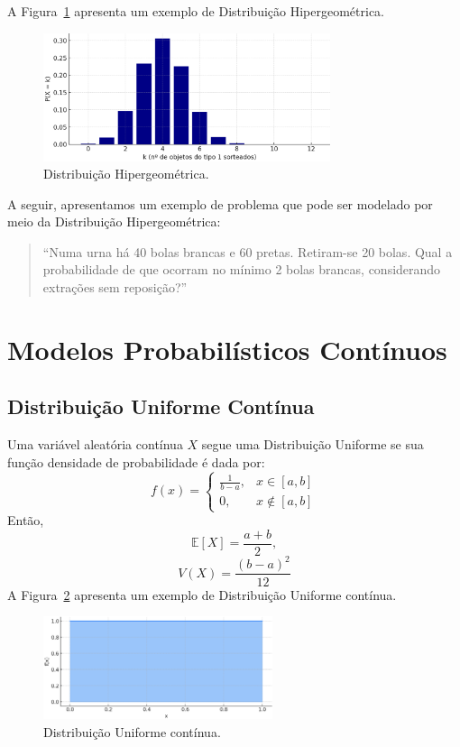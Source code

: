 \documentclass{article}
\begin{document}
A Figura~\ref{fig:dist_disc_hipergeometrica} apresenta um exemplo de Distribuição Hipergeométrica.

\begin{figure}[H]
    \centering
    \includegraphics[width=0.75\textwidth]{figuras/dist_disc_hipergeometrica.png}
    \caption{Distribuição Hipergeométrica.}
    \label{fig:dist_disc_hipergeometrica}
\end{figure}

A seguir, apresentamos um exemplo de problema que pode ser modelado por meio da Distribuição Hipergeométrica:
\begin{quote}
``Numa urna há 40 bolas brancas e 60 pretas. Retiram-se 20 bolas. Qual a probabilidade de que ocorram no mínimo 2 bolas brancas, considerando extrações sem reposição?''
\end{quote}

\section{Modelos Probabilísticos Contínuos}

\subsection{Distribuição Uniforme Contínua}
Uma variável aleatória contínua $X$ segue uma Distribuição Uniforme se sua função densidade de probabilidade é dada por:
    $$
    f(x) = \begin{cases}
    \frac{1}{b - a}, & x \in [a, b] \\
    0, & x \notin [a, b]
    \end{cases}
    $$
Então,
    $$
    \mathbb{E}[X] = \frac{a + b}{2},
    $$
    $$
    V(X) = \frac{(b - a)^2}{12}
    $$
A Figura~\ref{fig:dist_cont_uniforme} apresenta um exemplo de Distribuição Uniforme contínua.

\begin{figure}[H]
    \centering
    \includegraphics[width=0.6\textwidth]{figuras/dist_cont_uniforme.png}
    \caption{Distribuição Uniforme contínua.}
    \label{fig:dist_cont_uniforme}
\end{figure}
\end{document}
